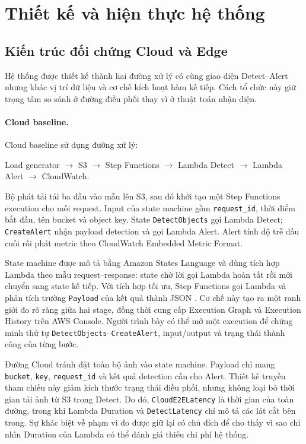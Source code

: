 \section{Thiết kế và hiện thực hệ thống}

\subsection{Kiến trúc đối chứng Cloud và Edge}

Hệ thống được thiết kế thành hai đường xử lý có cùng giao diện Detect--Alert nhưng
khác vị trí dữ liệu và cơ chế kích hoạt hàm kế tiếp. Cách tổ chức này giữ trọng tâm
so sánh ở đường điều phối thay vì ở thuật toán nhận diện.

\paragraph{Cloud baseline.}

Cloud baseline sử dụng đường xử lý:

\begin{center}
Load generator $\rightarrow$ S3 $\rightarrow$ Step Functions $\rightarrow$
Lambda Detect $\rightarrow$ Lambda Alert $\rightarrow$ CloudWatch.
\end{center}

Bộ phát tải tải ba đầu vào mẫu lên S3, sau đó khởi tạo một Step Functions execution
cho mỗi request. Input của state machine gồm \texttt{request\_id}, thời điểm bắt
đầu, tên bucket và object key. State \texttt{DetectObjects} gọi Lambda Detect;
\texttt{CreateAlert} nhận payload detection và gọi Lambda Alert. Alert tính độ trễ
đầu cuối rồi phát metric theo CloudWatch Embedded Metric Format.

State machine được mô tả bằng Amazon States Language và dùng tích hợp Lambda theo
mẫu request--response: state chờ lời gọi Lambda hoàn tất rồi mới chuyển sang state
kế tiếp. Với tích hợp tối ưu, Step Functions gọi Lambda và phân tích trường
\texttt{Payload} của kết quả thành JSON \cite{awsStepFunctions}. Cơ chế này tạo ra
một ranh giới đo rõ ràng giữa hai stage, đồng thời cung cấp Execution Graph và
Execution History trên AWS Console. Người trình bày có thể mở một execution để
chứng minh thứ tự \texttt{DetectObjects}--\texttt{CreateAlert}, input/output và
trạng thái thành công của từng bước.

Đường Cloud tránh đặt toàn bộ ảnh vào state machine. Payload chỉ mang
\texttt{bucket}, \texttt{key}, \texttt{request\_id} và kết quả detection cần cho
Alert. Thiết kế truyền tham chiếu này giảm kích thước trạng thái điều phối, nhưng
không loại bỏ thời gian tải ảnh từ S3 trong Detect. Do đó,
\texttt{CloudE2ELatency} là thời gian của toàn đường, trong khi Lambda Duration và
\texttt{DetectLatency} chỉ mô tả các lát cắt bên trong. Sự khác biệt về phạm vi đo
được giữ lại có chủ đích để cho thấy vì sao chỉ nhìn Duration của Lambda có thể
đánh giá thiếu chi phí hệ thống.

